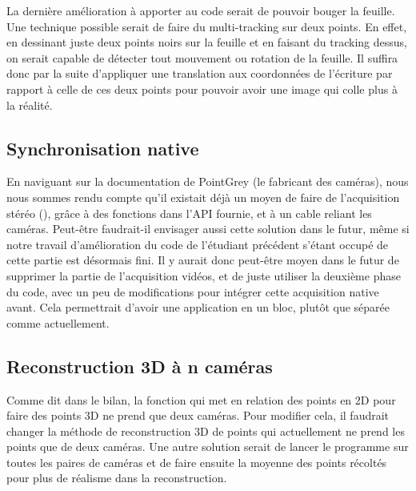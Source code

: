 La dernière amélioration à apporter au code serait de pouvoir bouger la feuille. Une technique possible serait de faire du multi-tracking sur deux points. En effet, en dessinant juste deux points noirs sur la feuille et en faisant du tracking dessus, on serait capable de détecter tout mouvement ou rotation de la feuille. Il suffira donc par la suite d'appliquer une translation aux coordonnées de l'écriture par rapport à celle de ces deux points pour pouvoir avoir une image qui colle plus à la réalité.

\subsection{Synchronisation native}
En naviguant sur la documentation de PointGrey (le fabricant des caméras), nous nous sommes rendu compte qu'il existait déjà un moyen de faire de l'ac\-qui\-si\-tion stéréo (\cite{stereo_pt}), grâce à des fonctions dans l'API fournie, et à un cable reliant les caméras. Peut-être faudrait-il envisager aussi cette solution dans le futur, même si notre travail d'amélioration du code de l'étudiant précédent s'étant occupé de cette partie est désormais fini. Il y aurait donc peut-être moyen dans le futur de supprimer la partie de l'acquisition vidéos, et de juste utiliser la deuxième phase du code, avec un peu de modifications pour intégrer cette acquisition native avant. Cela permettrait d'avoir une application en un bloc, plutôt que séparée comme actuellement.

\subsection{Reconstruction 3D à n caméras}
Comme dit dans le bilan, la fonction qui met en relation des points en 2D pour faire des points 3D ne prend que deux caméras. Pour modifier cela, il faudrait changer la méthode de reconstruction 3D de points qui actuellement ne prend les points que de deux caméras. Une autre solution serait de lancer le programme sur toutes les paires de caméras et de faire ensuite la moyenne des points récoltés pour plus de réalisme dans la reconstruction.